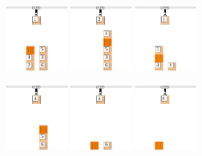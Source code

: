 \documentclass[varwidth]{standalone}
\begin{document}
\centering
\includegraphics[width=2cm]{demo1}\hspace{8mm}
\includegraphics[width=2cm]{demo2}\hspace{8mm}
\includegraphics[width=2cm]{demo3}

\vspace{8mm}

\includegraphics[width=2cm]{demo4}\hspace{8mm}
\includegraphics[width=2cm]{demo5}\hspace{8mm}
\includegraphics[width=2cm]{demo6}\quad
\end{document}
